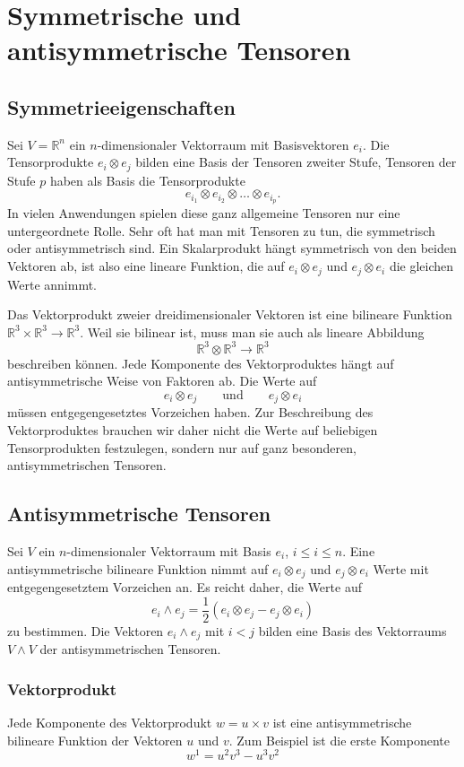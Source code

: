 %
%
%
\section{Symmetrische und antisymmetrische Tensoren%
\label{tensor:symmetrisch}}

\subsection{Symmetrieeigenschaften}
Sei $V=\mathbb R^n$ ein $n$-dimensionaler Vektorraum mit Basisvektoren $e_i$.
Die Tensorprodukte $e_i\otimes e_j$ bilden eine Basis der Tensoren
zweiter Stufe, Tensoren der Stufe $p$ haben als Basis die Tensorprodukte
\[
e_{i_1}\otimes e_{i_2}\otimes\dots\otimes e_{i_p}.
\]
In vielen Anwendungen spielen diese ganz allgemeine Tensoren nur eine
untergeordnete Rolle.
Sehr oft hat man mit Tensoren zu tun, die symmetrisch oder antisymmetrisch
sind. 
Ein Skalarprodukt hängt symmetrisch von den beiden Vektoren ab, ist
also eine lineare Funktion, die auf $e_i\otimes e_j$ und $e_j\otimes e_i$
die gleichen Werte annimmt.

Das Vektorprodukt zweier dreidimensionaler Vektoren ist eine
bilineare Funktion $\mathbb R^3\times\mathbb R^3\to\mathbb R^3$.
Weil sie bilinear ist, muss man sie auch als lineare Abbildung
\[
\mathbb R^3\otimes \mathbb R^3 \to \mathbb R^3
\]
beschreiben können.
Jede Komponente des Vektorproduktes hängt auf antisymmetrische
Weise von Faktoren ab.
Die Werte auf
\[
e_i\otimes e_j
\qquad\text{und}\qquad
e_j\otimes e_i
\]
müssen entgegengesetztes Vorzeichen haben.
Zur Beschreibung des Vektorproduktes brauchen wir daher nicht die Werte
auf beliebigen Tensorprodukten festzulegen, sondern nur auf ganz
besonderen, antisymmetrischen Tensoren.

\subsection{Antisymmetrische Tensoren}
Sei $V$ ein $n$-dimensionaler Vektorraum mit Basis $e_i$, $i\le i\le n$.
Eine antisymmetrische bilineare Funktion nimmt auf
$e_i\otimes e_j$ und $e_j\otimes e_i$
Werte mit entgegengesetztem Vorzeichen an.
Es reicht daher, die Werte auf
\[
e_i\wedge e_j
=
\frac12(
e_i\otimes e_j
-
e_j\otimes e_i
)
\]
zu bestimmen.
Die Vektoren $e_i\wedge e_j$ mit $i<j$ bilden eine Basis des Vektorraums
$V\wedge V$ der antisymmetrischen Tensoren.

\subsubsection{Vektorprodukt}
Jede Komponente des Vektorprodukt $w=u\times v$ ist eine antisymmetrische
bilineare Funktion der Vektoren $u$ und $v$.
Zum Beispiel ist die erste Komponente 
\[
w^1
=
u^2v^3-u^3v^2
\]

